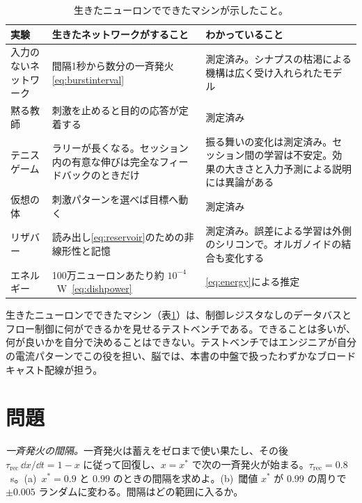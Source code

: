 \begin{table}[t]
\centering
\footnotesize
\setlength{\tabcolsep}{4pt}
\renewcommand{\arraystretch}{1.15}
\begin{tabular}{>{\raggedright}p{2.8cm}>{\raggedright}p{4.2cm}>{\raggedright\arraybackslash}p{5.8cm}}
\toprule
実験 & 生きたネットワークがすること & わかっていること \\
\midrule
入力のないネットワーク & 間隔1秒から数分の一斉発火\eqref{eq:burstinterval} & 測定済み。シナプスの枯渇による機構は広く受け入れられたモデル \\
黙る教師 & 刺激を止めると目的の応答が定着する & 測定済み \\
テニスゲーム & ラリーが長くなる。セッション内の有意な伸びは完全なフィードバックのときだけ & 振る舞いの変化は測定済み。セッション間の学習は不安定。効果の大きさと入力予測による説明には異論がある \\
仮想の体 & 刺激パターンを選べば目標へ動く & 測定済み \\
リザバー & 読み出し\eqref{eq:reservoir}のための非線形性と記憶 & 測定済み。誤差による学習は外側のシリコンで。オルガノイドの結合も変化する \\
エネルギー & 100万ニューロンあたり約 $10^{-4}$~W~\eqref{eq:dishpower} & \eqref{eq:energy}による推定 \\
\bottomrule
\end{tabular}
\caption{生きたニューロンでできたマシンが示したこと。}
\label{tab:livingmachine}
\end{table}

生きたニューロンでできたマシン（表\ref{tab:livingmachine}）は、制御レジスタなしのデータバスとフロー制御に何ができるかを見せるテストベンチである。できることは多いが、何が良いかを自分で決めることはできない。テストベンチではエンジニアが自分の電流パターンでこの役を担い、脳では、本書の中盤で扱ったわずかなブロードキャスト配線が担う。

\section{問題}

\begin{exercise}[\lvlA]
\label{ex:21:1}
\emph{一斉発火の間隔。}一斉発火は蓄えをゼロまで使い果たし、その後 $\tau_{\text{rec}}\,\dd x/\dd t=1-x$ に従って回復し、$x=x^*$ で次の一斉発火が始まる。$\tau_{\text{rec}}=0.8$~s。(a)~$x^*=0.9$ と $0.99$ のときの間隔を求めよ。(b)~閾値 $x^*$ が $0.99$ の周りで $\pm0.005$ ランダムに変わる。間隔はどの範囲に入るか。
\end{exercise}

